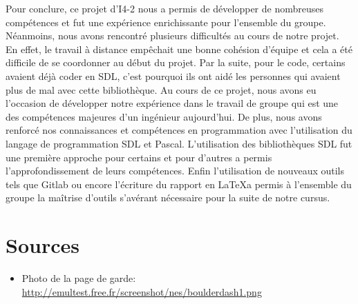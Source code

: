 \documentclass[11pt,a4paper]{article}
\begin{document}
    Pour conclure, ce projet d'I4-2 nous a permis de développer de nombreuses compétences et fut une expérience enrichissante pour l'ensemble du groupe. Néanmoins, nous avons rencontré plusieurs difficultés au cours de notre projet. En effet, le travail à distance empêchait une bonne cohésion d'équipe et cela a été difficile de se coordonner au début du projet. Par la suite, pour le code, certains avaient déjà coder en SDL, c'est pourquoi ils ont aidé les personnes qui avaient plus de mal avec cette bibliothèque. 
    Au cours de ce projet, nous avons eu l'occasion de développer notre expérience dans le travail de groupe qui est une des compétences majeures d'un ingénieur aujourd'hui. De plus, nous avons renforcé nos connaissances et compétences en programmation avec l'utilisation du langage de programmation SDL et Pascal. L'utilisation des bibliothèques SDL fut une première approche pour certains et pour d'autres a permis l'approfondissement de leurs compétences. Enfin l'utilisation de nouveaux outils tels que Gitlab ou encore l'écriture du rapport en \LaTeX a permis à l'ensemble du groupe la maîtrise d'outils s'avérant nécessaire pour la suite de notre cursus.


\clearpage %

\section*{Sources} %
    \begin{itemize}
        \item Photo de la page de garde: \url{http://emultest.free.fr/screenshot/nes/boulderdash1.png}
    \end{itemize}
\end{document}
